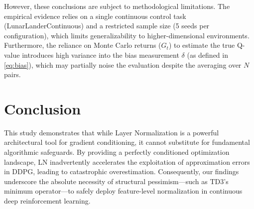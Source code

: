 \documentclass[10pt,a4paper]{article}
\begin{document}
However, these conclusions are subject to methodological limitations. The empirical evidence relies on a single continuous control task (LunarLanderContinuous) and a restricted sample size (5 seeds per configuration), which limits generalizability to higher-dimensional environments. Furthermore, the reliance on Monte Carlo returns ($G_t$) to estimate the true Q-value introduces high variance into the bias measurement $\delta$ (as defined in \cref{eq:bias}), which may partially noise the evaluation despite the averaging over $N$ pairs.

\section{Conclusion}
\label{sec:conclusion}
This study demonstrates that while Layer Normalization is a powerful architectural tool for gradient conditioning, it cannot substitute for fundamental algorithmic safeguards. By providing a perfectly conditioned optimization landscape, LN inadvertently accelerates the exploitation of approximation errors in DDPG, leading to catastrophic overestimation. Consequently, our findings underscore the absolute necessity of structural pessimism—such as TD3's minimum operator—to safely deploy feature-level normalization in continuous deep reinforcement learning.



\end{document}
